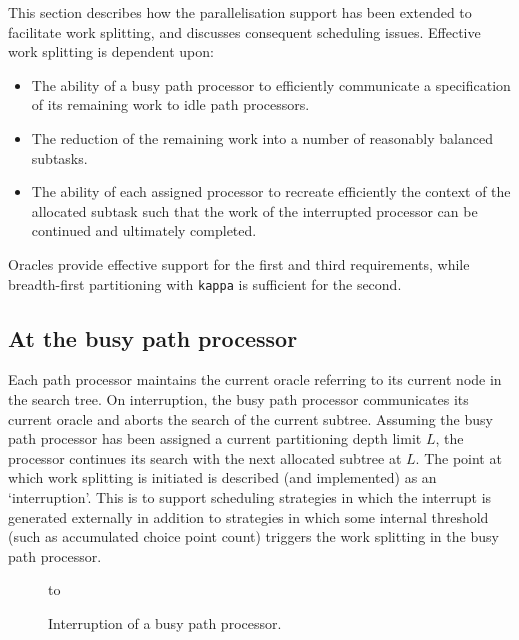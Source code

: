This section describes how the parallelisation support has been extended to
facilitate work splitting, and discusses consequent scheduling issues.  
Effective work splitting is dependent upon:
\begin{itemize}
\item{The ability of a busy path processor to efficiently communicate a specification
  of its remaining work to idle path processors.}
\item{The reduction of the remaining work into a number of reasonably balanced
  subtasks.}
\item{The ability of each assigned processor to recreate efficiently the context
  of the allocated subtask such that the work of the interrupted processor can
  be continued and ultimately completed.}
\end{itemize}

Oracles provide effective support for the first and third requirements, while
breadth-first partitioning with \texttt{kappa} is sufficient for the second.

\subsection{At the busy path processor}

Each path processor maintains the current oracle referring to its current node
in the search tree. On interruption, the busy path processor communicates
its current oracle and aborts the search of the current subtree.  Assuming the
busy path processor has been assigned a current partitioning depth limit $L$,
the processor continues its search with the next allocated subtree at $L$.  The
point at which work splitting is initiated is described (and implemented) 
as an `interruption'. This is to support scheduling strategies in which the interrupt
is generated externally in addition to strategies in
which some internal threshold (such as accumulated choice point count) triggers
the work splitting in the busy path processor.

\begin{figure}[htb]
\vspace{5mm} \hbox to 
\caption{Interruption of a busy path processor.}
\vspace{5mm}
\label{busy_pp}
\end{figure}


